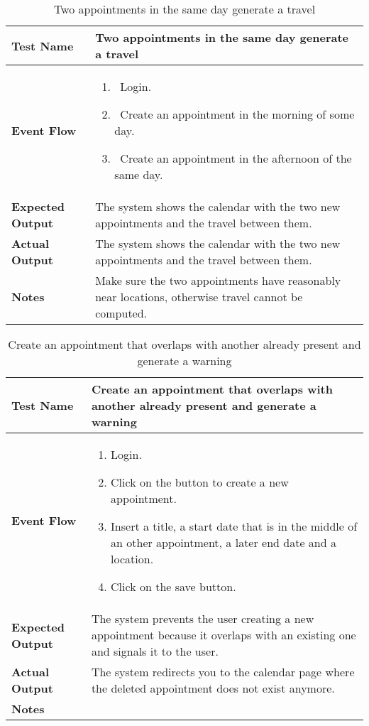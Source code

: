 \begin{table}[h]	
\centering
\def\arraystretch{1.5}
\begin{tabular}{|m{7cm}|m{7cm}|}
	\hline
	\textbf{Test Name}            &  Two appointments in the same day generate a travel  \\ \hline
	\textbf{Event Flow}             & 
		\begin{enumerate}
			\item~Login.
			\item~Create an appointment in the morning of some day.
			\item~Create an appointment in the afternoon of the same day.
		\end{enumerate}
	  \\ \hline
	\textbf{Expected Output}  &   The system shows the calendar with the two new appointments and the travel between them.  \\ \hline
	\textbf{Actual Output}       &  The system shows the calendar with the two new appointments and the travel between them.   \\ \hline
	\textbf{Notes} &  Make sure the two appointments have reasonably near locations, otherwise travel cannot be computed.  \\ \hline
\end{tabular}
\caption{Two appointments in the same day generate a travel}
\end{table}


\begin{table}[h]	
	\centering
	\def\arraystretch{1.5}
	\begin{tabular}{|m{7cm}|m{7cm}|}
		\hline
		\textbf{Test Name}            & Create an appointment that overlaps with another already present and generate a warning  \\ \hline
		\textbf{Event Flow}             & 
		\begin{enumerate}
			\item Login.
			\item Click on the button to create a new appointment.
			\item Insert a title, a start date that is in the middle of an other appointment, a later end date and a location.
			\item Click on the save button.
		\end{enumerate} \\ \hline
		\textbf{Expected Output}  &  The system prevents the user creating a new appointment because it overlaps with an existing one and signals it to the user.  \\ \hline
		\textbf{Actual Output}       & The system redirects you to the calendar page where the deleted appointment does not exist anymore.    \\ \hline
		\textbf{Notes} & \\ \hline
	\end{tabular}
	\caption{ Create an appointment that overlaps with another already present and generate a warning }
\end{table}


